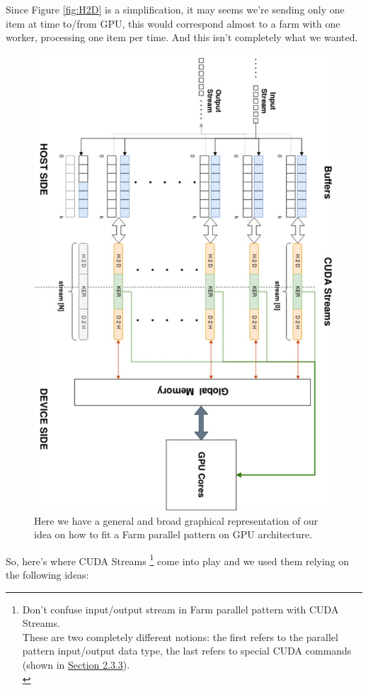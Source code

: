 	Since Figure \ref{fig:H2D} is a simplification, it may seems we're sending only one item at time to/from GPU, this would correspond almost to a farm with one worker, processing one item per time. And this isn't completely what we wanted.\\
	\begin{figure}
		\vspace{-2cm}
		\includegraphics[scale=0.62,angle=-90]{images/overallLogic.jpg}
		\caption{Here we have a general and broad graphical representation of our idea on how to fit a Farm parallel pattern on GPU architecture.}
		\label{fig:overallLogic}
	\end{figure}
	So, here's where CUDA Streams \footnote{Don't confuse input/output stream in Farm parallel pattern with CUDA Streams.\\ These are two completely different notions: the first refers to the parallel pattern input/output data type, the last refers to special CUDA commands (shown in \hyperref[subs:streams]{Section 2.3.3}).\\} come into play and we used them relying on the following ideas:

